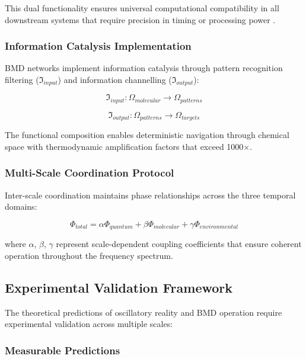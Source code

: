 \documentclass[12pt,a4paper]{article}
\begin{document}
This dual functionality ensures universal computational compatibility in all downstream systems that require precision in timing or processing power \cite{sterling2015principles}.

\subsubsection{Information Catalysis Implementation}

BMD networks implement information catalysis through pattern recognition filtering ($\mathfrak{I}_{input}$) and information channelling ($\mathfrak{I}_{output}$):

\begin{equation}
\mathfrak{I}_{input}: \Omega_{molecular} \rightarrow \Omega_{patterns}
\end{equation}

\begin{equation}
\mathfrak{I}_{output}: \Omega_{patterns} \rightarrow \Omega_{targets}
\end{equation}

The functional composition enables deterministic navigation through chemical space with thermodynamic amplification factors that exceed 1000×.

\subsubsection{Multi-Scale Coordination Protocol}

Inter-scale coordination maintains phase relationships across the three temporal domains:

\begin{equation}
\Phi_{total} = \alpha \Phi_{quantum} + \beta \Phi_{molecular} + \gamma \Phi_{environmental}
\end{equation}

where $\alpha$, $\beta$, $\gamma$ represent scale-dependent coupling coefficients that ensure coherent operation throughout the frequency spectrum.

\subsection{Experimental Validation Framework}

The theoretical predictions of oscillatory reality and BMD operation require experimental validation across multiple scales:

\subsubsection{Measurable Predictions}
\end{document}
